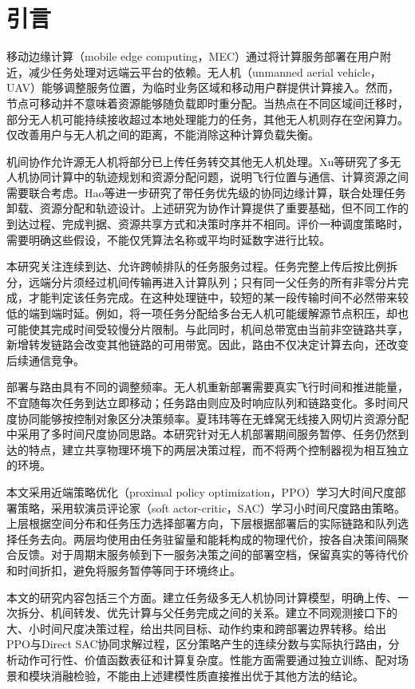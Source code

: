 \section{引言}
移动边缘计算（mobile edge computing，MEC）通过将计算服务部署在用户附近，减少任务处理对远端云平台的依赖。无人机（unmanned aerial vehicle，UAV）能够调整服务位置，为临时业务区域和移动用户群提供计算接入。然而，节点可移动并不意味着资源能够随负载即时重分配。当热点在不同区域间迁移时，部分无人机可能持续接收超过本地处理能力的任务，其他无人机则存在空闲算力。仅改善用户与无人机之间的距离，不能消除这种计算负载失衡。

机间协作允许源无人机将部分已上传任务转交其他无人机处理。Xu等研究了多无人机协同计算中的轨迹规划和资源分配问题，说明飞行位置与通信、计算资源之间需要联合考虑\cite{xu2024}。Hao等进一步研究了带任务优先级的协同边缘计算，联合处理任务卸载、资源分配和轨迹设计\cite{hao2024}。上述研究为协作计算提供了重要基础，但不同工作的到达过程、完成判据、资源共享方式和决策时序并不相同。评价一种调度策略时，需要明确这些假设，不能仅凭算法名称或平均时延数字进行比较。

本研究关注连续到达、允许跨帧排队的任务服务过程。任务完整上传后按比例拆分，远端分片须经过机间传输再进入计算队列；只有同一父任务的所有非零分片完成，才能判定该任务完成。在这种处理链中，较短的某一段传输时间不必然带来较低的端到端时延。例如，将一项任务分配给多台无人机可能缓解源节点积压，却也可能使其完成时间受较慢分片限制。与此同时，机间总带宽由当前非空链路共享，新增转发链路会改变其他链路的可用带宽。因此，路由不仅决定计算去向，还改变后续通信竞争。

部署与路由具有不同的调整频率。无人机重新部署需要真实飞行时间和推进能量，不宜随每次任务到达立即移动；任务路由则应及时响应队列和链路变化。多时间尺度协同能够按控制对象区分决策频率。夏玮玮等在无蜂窝无线接入网切片资源分配中采用了多时间尺度协同思路\cite{xia2025}。本研究针对无人机部署期间服务暂停、任务仍然到达的特点，建立共享物理环境下的两层决策过程，而不将两个控制器视为相互独立的环境。

本文采用近端策略优化（proximal policy optimization，PPO）学习大时间尺度部署策略\cite{ppo2017}，采用软演员评论家（soft actor-critic，SAC）学习小时间尺度路由策略\cite{sac2018}。上层根据空间分布和任务压力选择部署方向，下层根据部署后的实际链路和队列选择任务去向。两层均使用由任务驻留量和能耗构成的物理代价，按各自决策间隔聚合反馈。对于周期末服务帧到下一服务决策之间的部署空档，保留真实的等待代价和时间折扣，避免将服务暂停等同于环境终止。

本文的研究内容包括三个方面。建立任务级多无人机协同计算模型，明确上传、一次拆分、机间转发、优先计算与父任务完成之间的关系。建立不同观测接口下的大、小时间尺度决策过程，给出共同目标、动作约束和跨部署边界转移。给出PPO与Direct SAC协同求解过程，区分策略产生的连续分数与实际执行路由，分析动作可行性、价值函数表征和计算复杂度。性能方面需要通过独立训练、配对场景和模块消融检验，不能由上述建模性质直接推出优于其他方法的结论。
